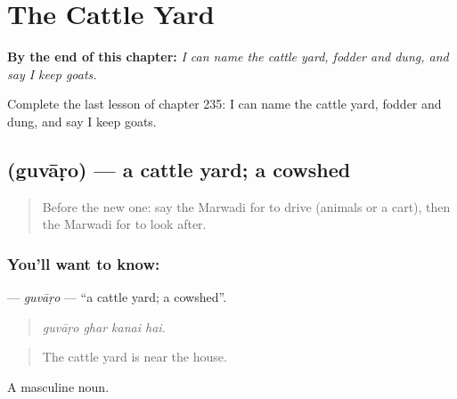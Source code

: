 
\chapter{The Cattle Yard}
\label{ch:mw-the-cattle-yard}

\begin{chapteropening}
\textbf{By the end of this chapter:} \emph{I can name the cattle yard, fodder and dung, and say I keep goats.}

Complete the last lesson of chapter 235: I can name the cattle yard, fodder and dung, and say I keep goats.
\end{chapteropening}

\section[\texorpdfstring{\mw{गुवाड़ो} (guvāṛo)}{गुवाड़ो (guvāṛo)}]{ (guvāṛo) — a cattle yard; a cowshed}

\label{lesson:MW-C235-guvaro}



\begin{quote}
Before the new one: say the Marwadi for to drive (animals or a cart), then the Marwadi for to look after.
\end{quote}

\subsection*{You'll want to know: }
\textbf{} — \emph{guvāṛo} — \textquotedblleft{}a cattle yard; a cowshed\textquotedblright{}.

\begin{quote}
   
\end{quote}

\begin{quote}
\emph{guvāṛo ghar kanai hai.}
\end{quote}

\begin{quote}
The cattle yard is near the house.
\end{quote}

A masculine noun.

